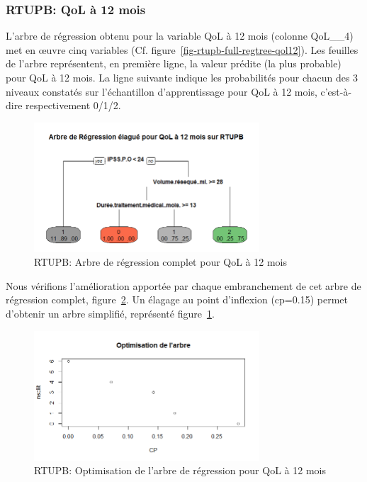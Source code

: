 \subsubsection{RTUPB: QoL à 12 mois}

L'arbre de régression obtenu pour la variable QoL à 12 mois (colonne QoL\_\_4) met en {\oe}uvre cinq variables (Cf. figure~\ref{fig-rtupb-full-regtree-qol12}). Les feuilles de l'arbre représentent, en première ligne, la valeur prédite (la plus probable) pour QoL à 12 mois. La ligne suivante indique les probabilités pour chacun des 3 niveaux constatés sur l'échantillon d'apprentissage pour QoL à 12 mois, c'est-à-dire respectivement 0/1/2. 

\begin{figure}[H]
\centering
\includegraphics[width=0.75\textwidth]{../Fig/RTUPB/rtupb-regtree-qol12.png}
\caption{RTUPB: Arbre de régression complet pour QoL à 12 mois}
\label{fig-rtupb-regtree-qol12}
\end{figure}

Nous vérifions l'amélioration apportée par chaque embranchement de cet arbre de régression complet, figure~\ref{fig-rtupb-regtree-optim-qol12}. Un élagage au point d'inflexion (cp=0.15) permet d'obtenir un arbre simplifié, représenté figure~\ref{fig-rtupb-regtree-qol12}.

\begin{figure}[H]
\centering
\includegraphics[width=0.75\textwidth]{../Fig/RTUPB/rtupb-regtree-optim-qol12.png}
\caption{RTUPB: Optimisation de l'arbre de régression pour QoL à 12 mois}
\label{fig-rtupb-regtree-optim-qol12}
\end{figure}

